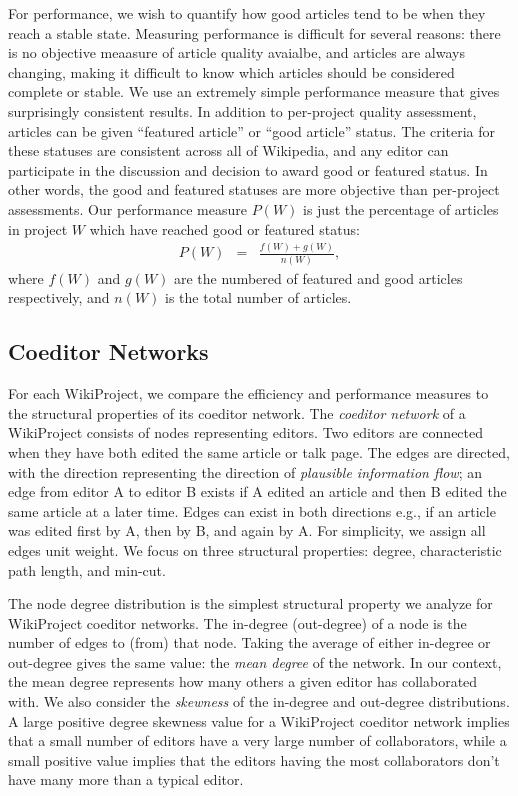 \documentclass[10pt,twocolumn]{article}
\newcommand{\beq}{\begin{eqnarray}}
\newcommand{\eeq}{\end{eqnarray}}
\begin{document}
For performance, we wish to quantify how good articles tend to be when they reach a stable state.
Measuring performance is difficult for several reasons:
there is no objective meaasure of article quality avaialbe,
and articles are always changing, making it difficult to know which articles should be considered
complete or stable.
We use an extremely simple performance measure that gives surprisingly consistent results.
In addition to per-project quality assessment, articles can be given ``featured article'' or
``good article'' status.
The criteria for these statuses are consistent across all of Wikipedia,
and any editor can participate in the discussion and decision to award good or featured
status.
In other words, the good and featured statuses are more objective than per-project assessments.
Our performance measure $P(W)$ is just the percentage of articles in project $W$ which have reached
good or featured status:
\beq
P(W) &=& \frac{f(W) + g(W)}{n(W)},
\eeq
where $f(W)$ and $g(W)$ are the numbered of featured and good articles respectively,
and $n(W)$ is the total number of articles.

\subsection{Coeditor Networks}

For each WikiProject, we compare the efficiency and performance measures to the structural
properties of its coeditor network.
The {\em coeditor network} of a WikiProject consists of nodes representing editors.
Two editors are connected when they have both edited the same article or talk page.
The edges are directed, with the direction representing the direction of
{\em plausible information flow};
an edge from editor A to editor B exists if A edited an article and then B edited the same article at
a later time.
Edges can exist in both directions e.g., if an article was edited first by A, then by B, and again by A.
For simplicity, we assign all edges unit weight.
We focus on three structural properties: degree, characteristic path length, and min-cut.

The node degree distribution is the simplest structural property we analyze for WikiProject
coeditor networks.
The in-degree (out-degree) of a node is the number of edges to (from) that node.
Taking the average of either in-degree or out-degree gives the same value:
the {\em mean degree} of the network.
In our context, the mean degree represents how many others a given editor has collaborated with.
We also consider the {\em skewness} of the in-degree and out-degree distributions.
A large positive degree skewness value for a WikiProject coeditor network
implies that a small number of editors have a very large number of collaborators,
while a small positive value implies that the editors having the most collaborators
don't have many more than a typical editor.
\end{document}
